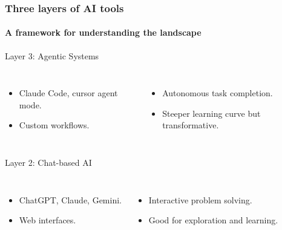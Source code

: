 \documentclass[aspectratio=169]{beamer}
\begin{document}
\begin{frame}
    \frametitle{Three layers of AI tools}
    \framesubtitle{A framework for understanding the landscape}
    \begin{block}{Layer 3: Agentic Systems}
        \vspace{-0.3cm}
        \begin{columns}
            \begin{itemize}
                \item Claude Code, cursor agent mode.
                \item Custom workflows.
            \end{itemize}
            \begin{itemize}
                \item Autonomous task completion.
                \item Steeper learning curve but transformative.
            \end{itemize}
        \end{columns}
    \end{block}
    
    \vspace{0.5cm}
    
    \begin{block}{Layer 2: Chat-based AI}
        \vspace{-0.3cm}
        \begin{columns}
            \begin{itemize}
                \item ChatGPT, Claude, Gemini.
                \item Web interfaces.
            \end{itemize}
            \begin{itemize}
                \item Interactive problem solving.
                \item Good for exploration and learning.
            \end{itemize}
        \end{columns}
    \end{block}
    
    \vspace{0.5cm}
    

\end{frame}
\end{document}
